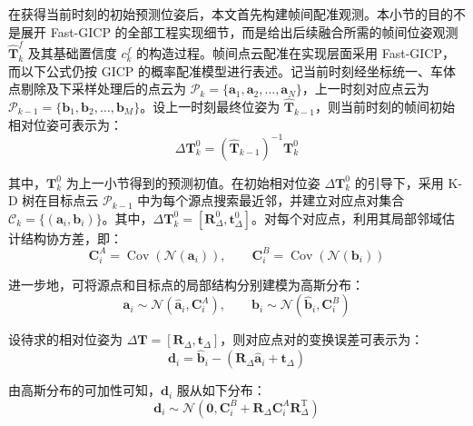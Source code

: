 在获得当前时刻的初始预测位姿后，本文首先构建帧间配准观测。本小节的目的不是展开 Fast-GICP 的全部工程实现细节，而是给出后续融合所需的帧间位姿观测 $\hat{\mathbf{T}}_{k}^{f}$ 及其基础置信度 $c_{k}^{f}$ 的构造过程。帧间点云配准在实现层面采用 Fast-GICP，而以下公式仍按 GICP 的概率配准模型进行表述。记当前时刻经坐标统一、车体点剔除及下采样处理后的点云为 $\mathcal{P}_{k}=\{\mathbf{a}_1,\mathbf{a}_2,\dots,\mathbf{a}_N\}$，上一时刻对应点云为 $\mathcal{P}_{k-1}=\{\mathbf{b}_1,\mathbf{b}_2,\dots,\mathbf{b}_M\}$。设上一时刻最终位姿为 $\hat{\mathbf{T}}_{k-1}$，则当前时刻的帧间初始相对位姿可表示为：
\begin{equation}
\Delta \mathbf{T}_{k}^{0}
=
\left(\hat{\mathbf{T}}_{k-1}\right)^{-1}\mathbf{T}_{k}^{0}
\end{equation}

其中，$\mathbf{T}_{k}^{0}$ 为上一小节得到的预测初值。在初始相对位姿 $\Delta \mathbf{T}_{k}^{0}$ 的引导下，采用 K-D 树在目标点云 $\mathcal{P}_{k-1}$ 中为每个源点搜索最近邻，并建立对应点对集合 $\mathcal{C}_{k}=\{(\mathbf{a}_i,\mathbf{b}_i)\}$。其中，$\Delta \mathbf{T}_{k}^{0}=[\mathbf{R}_{\Delta}^{0},\mathbf{t}_{\Delta}^{0}]$。对每个对应点，利用其局部邻域估计结构协方差，即：
\begin{equation}
\mathbf{C}_{i}^{A}
=
\operatorname{Cov}\!\left(\mathcal{N}(\mathbf{a}_i)\right),
\qquad
\mathbf{C}_{i}^{B}
=
\operatorname{Cov}\!\left(\mathcal{N}(\mathbf{b}_i)\right)
\end{equation}

进一步地，可将源点和目标点的局部结构分别建模为高斯分布：
\begin{equation}
\mathbf{a}_i \sim \mathcal{N}\!\left(\hat{\mathbf{a}}_i,\mathbf{C}_{i}^{A}\right),
\qquad
\mathbf{b}_i \sim \mathcal{N}\!\left(\hat{\mathbf{b}}_i,\mathbf{C}_{i}^{B}\right)
\end{equation}

设待求的相对位姿为 $\Delta \mathbf{T}=[\mathbf{R}_{\Delta},\mathbf{t}_{\Delta}]$，则对应点对的变换误差可表示为：
\begin{equation}
\mathbf{d}_i
=
\hat{\mathbf{b}}_i-\left(\mathbf{R}_{\Delta}\hat{\mathbf{a}}_i+\mathbf{t}_{\Delta}\right)
\end{equation}

由高斯分布的可加性可知，$\mathbf{d}_i$ 服从如下分布：
\begin{equation}
\mathbf{d}_i
\sim
\mathcal{N}\!\left(
\mathbf{0},
\mathbf{C}_{i}^{B}+\mathbf{R}_{\Delta}\mathbf{C}_{i}^{A}\mathbf{R}_{\Delta}^{\mathrm{T}}
\right)
\end{equation}

